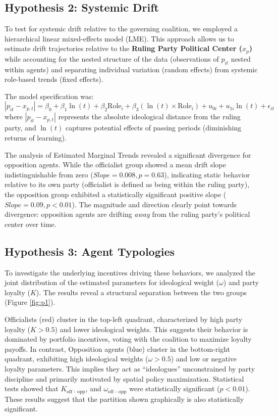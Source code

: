 \documentclass{article}
\begin{document}
	\subsection{Hypothesis 2: Systemic Drift}
	To test for systemic drift relative to the governing coalition, we employed a hierarchical linear mixed-effects model (LME). This approach allows us to estimate drift trajectories relative to the \textbf{Ruling Party Political Center ($x_p$)} while accounting for the nested structure of the data (observations of $p_{it}$ nested within agents) and separating individual variation (random effects) from systemic role-based trends (fixed effects).
	
	The model specification was:
	\begin{equation}
		|p_{it} - x_{p,t}| = \beta_0 + \beta_1 \ln(t) + \beta_2 \text{Role}_i + \beta_3 (\ln(t) \times \text{Role}_i) + u_{0i} + u_{1i} \ln(t) + \epsilon_{it}
	\end{equation}
	where $|p_{it} - x_{p,t}|$ represents the absolute ideological distance from the ruling party, and $\ln(t)$ captures potential effects of passing periods (diminishing returns of learning).
	
	The analysis of Estimated Marginal Trends revealed a significant divergence for opposition agents. While the officialist group showed a mean drift slope indistinguishable from zero ($Slope = 0.008, p = 0.63$), indicating static behavior relative to its own party (officialist is defined as being within the ruling party), the opposition group exhibited a statistically significant positive slope ($Slope = 0.09, p < 0.01$). The magnitude and direction clearly point towards divergence: opposition agents are drifting \textit{away} from the ruling party's political center over time.
	
	\subsection{Hypothesis 3: Agent Typologies}
	
	To investigate the underlying incentives driving these behaviors, we analyzed the joint distribution of the estimated parameters for ideological weight ($\omega$) and party loyalty ($K$). The results reveal a structural separation between the two groups (Figure \ref{fig:p1}). 
	
	Officialists (red) cluster in the top-left quadrant, characterized by high party loyalty ($K > 0.5$) and lower ideological weights. This suggests their behavior is dominated by portfolio incentives, voting with the coalition to maximize loyalty payoffs. In contrast, Opposition agents (blue) cluster in the bottom-right quadrant, exhibiting high ideological weights ($\omega > 0.5$) and low or negative loyalty parameters. This implies they act as ``ideologues'' unconstrained by party discipline and primarily motivated by spatial policy maximization. Statistical tests showed that $K_{\text{off - opp}}$, and $\omega_{\text{off - opp}}$ were statistically significant ($p < 0.01$). These results suggest that the partition shown graphically is also statistically significant.
	
\end{document}

